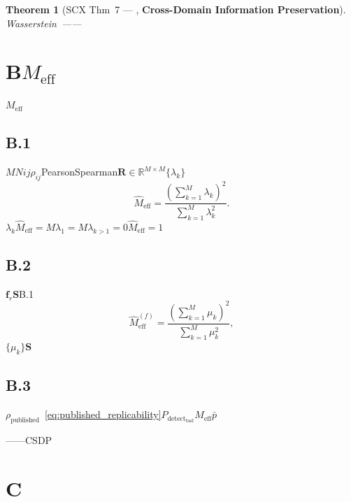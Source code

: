 \documentclass[12pt,a4paper]{article}
\newtheorem{theorem}{Theorem}[section]
\theoremstyle{remark}
\newcommand{\R}{\mathbb{R}}
\newcommand{\detectProb}{P_{\text{detect}}}
\begin{document}
\begin{theorem}[SCX Thm~7 — , \textbf{Cross-Domain Information Preservation}]
\label{thm:scx7_formal}
Wasserstein~\cite{scx_thm7}——
\end{theorem}

\section{B$M_{\text{eff}}$}
\label{app:Meff_estimation}

$M_{\text{eff}}$

\subsection{B.1 }

$M$$N$$i$$j$$\rho_{ij}$PearsonSpearman$\mathbf{R} \in \R^{M \times M}$$\{\lambda_k\}$
\begin{equation}
    \widehat{M}_{\text{eff}} = \frac{(\sum_{k=1}^{M} \lambda_k)^2}{\sum_{k=1}^{M} \lambda_k^2}.
    \label{eq:Meff_corr}
\end{equation}
$\lambda_k$$\widehat{M}_{\text{eff}} = M$$\lambda_1 = M$$\lambda_{k>1} = 0$$\widehat{M}_{\text{eff}} = 1$

\subsection{B.2 }

$\mathbf{f}_r$$\mathbf{S}$B.1
\begin{equation}
    \widehat{M}_{\text{eff}}^{(f)} = \frac{(\sum_{k=1}^{M} \mu_k)^2}{\sum_{k=1}^{M} \mu_k^2},
    \label{eq:Meff_features}
\end{equation}
$\{\mu_k\}$$\mathbf{S}$

\subsection{B.3 }

$\rho_{\text{published}}$~\eqref{eq:published_replicability}$\detectProb_{\text{bad}}$$M_{\text{eff}}$$\bar{p}$

\begin{honestcrit}{——CSDP\textit{}}
\end{honestcrit}

\section{C}
\label{app:CSDP_template}
\end{document}

